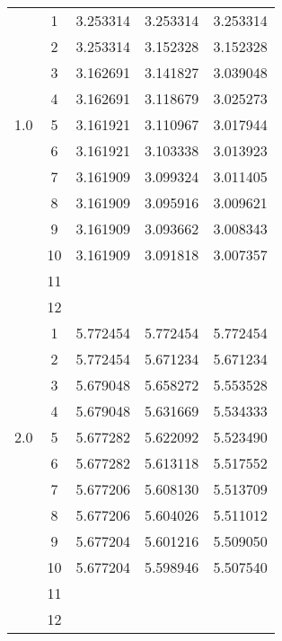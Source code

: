 \documentclass[
    a4paper, aps, twocolumn, floatfix, superscriptaddress,
    nofootinbib]{revtex4-1}
\newcommand{\1}{\mathds{1}}
\begin{document}
\begin{table}
\begin{ruledtabular}
\begin{tabular}{c|c|ccc}
                         &  1  & 3.253314 & 3.253314 & 3.253314 \\
                         &  2  & 3.253314 & 3.152328 & 3.152328 \\
                         &  3  & 3.162691 & 3.141827 & 3.039048 \\
                         &  4  & 3.162691 & 3.118679 & 3.025273 \\
                     1.0 &  5  & 3.161921 & 3.110967 & 3.017944 \\
                         &  6  & 3.161921 & 3.103338 & 3.013923 \\
                         &  7  & 3.161909 & 3.099324 & 3.011405 \\
                         &  8  & 3.161909 & 3.095916 & 3.009621 \\
                         &  9  & 3.161909 & 3.093662 & 3.008343 \\
                         &  10 & 3.161909 & 3.091818 & 3.007357 \\
                         &  11 & & & \\
                         &  12 &  & & \\ \hline

                         &  1  & 5.772454 & 5.772454 & 5.772454 \\
                         &  2  & 5.772454 & 5.671234 & 5.671234 \\
                         &  3  & 5.679048 & 5.658272 & 5.553528 \\
                         &  4  & 5.679048 & 5.631669 & 5.534333 \\
                     2.0 &  5  & 5.677282 & 5.622092 & 5.523490 \\
                         &  6  & 5.677282 & 5.613118 & 5.517552 \\
                         &  7  & 5.677206 & 5.608130 & 5.513709 \\
                         &  8  & 5.677206 & 5.604026 & 5.511012 \\
                         &  9  & 5.677204 & 5.601216 & 5.509050 \\
                         &  10 & 5.677204 & 5.598946 & 5.507540 \\
                         &  11 &  & & \\
                         &  12 &  & & \\
            \end{tabular}
        \end{ruledtabular}
        \label{tab:N2}
    \end{table}
\end{document}
